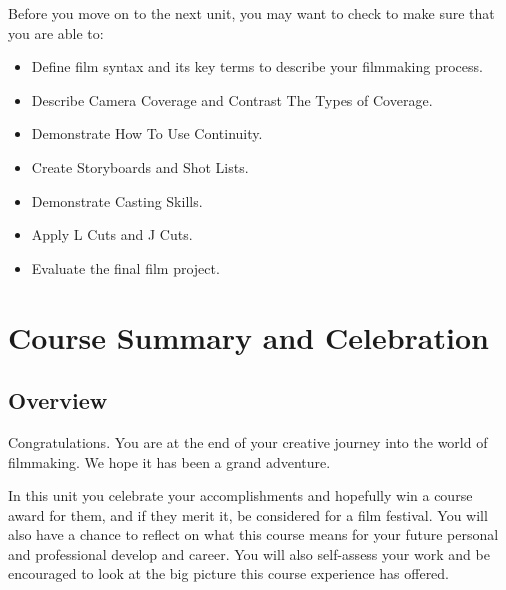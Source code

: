 \documentclass[
  letterpaper,
  DIV=11,
  numbers=noendperiod]{scrreprt}
\providecommand{\tightlist}{%
  \setlength{\itemsep}{0pt}\setlength{\parskip}{0pt}}\usepackage{longtable,booktabs,array}
\begin{document}
\begin{tcolorbox}[enhanced jigsaw, titlerule=0mm, opacitybacktitle=0.6, left=2mm, title={Checking Your Learning}, coltitle=black, colbacktitle=quarto-callout-note-color!10!white, toptitle=1mm, bottomtitle=1mm, colframe=quarto-callout-note-color-frame, colback=white, arc=.35mm, rightrule=.15mm, bottomrule=.15mm, toprule=.15mm, opacityback=0, breakable, leftrule=.75mm]

Before you move on to the next unit, you may want to check to make sure
that you are able to:

\begin{itemize}
\tightlist
\item
  Define film syntax and its key terms to describe your filmmaking
  process.
\item
  Describe Camera Coverage and Contrast The Types of Coverage.
\item
  Demonstrate How To Use Continuity.
\item
  Create Storyboards and Shot Lists.
\item
  Demonstrate Casting Skills.
\item
  Apply L Cuts and J Cuts.
\item
  Evaluate the final film project.
\end{itemize}

\end{tcolorbox}


\chapter{Course Summary and
Celebration}\label{course-summary-and-celebration}

\section*{Overview}\label{overview-9}


Congratulations. You are at the end of your creative journey into the
world of filmmaking. We hope it has been a grand adventure.

In this unit you celebrate your accomplishments and hopefully win a
course award for them, and if they merit it, be considered for a film
festival. You will also have a chance to reflect on what this course
means for your future personal and professional develop and career. You
will also self-assess your work and be encouraged to look at the big
picture this course experience has offered.
\end{document}
